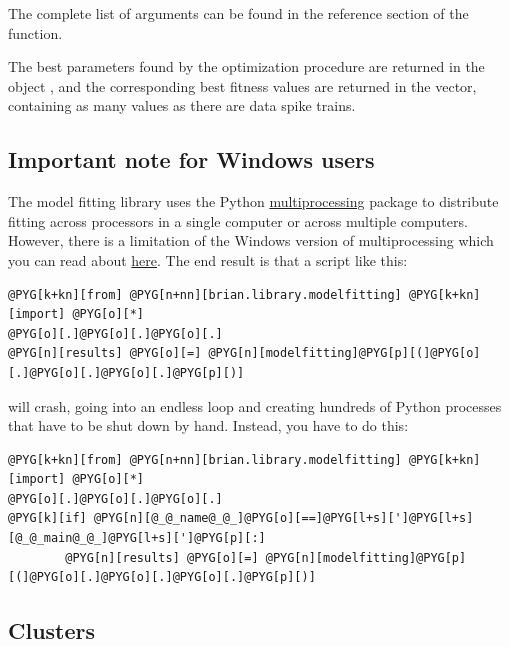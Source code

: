 \documentclass[letterpaper,10pt,english]{manual}
\begin{document}
The complete list of arguments can be found in the reference
section of the \hyperlink{brian.library.modelfitting.modelfitting}{} function.

The best parameters found by the optimization procedure are returned in the \hyperlink{brian.Parameters}{}
object , and the corresponding best fitness values are returned in the
 vector, containing as many values as there are data spike trains.
\hypertarget{note-for-windows-users}{}

\subsection{Important note for Windows users}

The model fitting library uses the Python \href{http://docs.python.org/library/multiprocessing.html}{multiprocessing}
package to distribute fitting across processors in a single computer or across
multiple computers. However, there is a limitation of the Windows version of
multiprocessing which you can read about \href{http://docs.python.org/library/multiprocessing.html\#windows}{here}.
The end result is that a script like this:

\begin{Verbatim}[commandchars=@\[\]]
@PYG[k+kn][from] @PYG[n+nn][brian.library.modelfitting] @PYG[k+kn][import] @PYG[o][*]
@PYG[o][.]@PYG[o][.]@PYG[o][.]
@PYG[n][results] @PYG[o][=] @PYG[n][modelfitting]@PYG[p][(]@PYG[o][.]@PYG[o][.]@PYG[o][.]@PYG[p][)]
\end{Verbatim}

will crash, going into an endless loop and creating hundreds of Python processes
that have to be shut down by hand. Instead, you have to do this:

\begin{Verbatim}[commandchars=@\[\]]
@PYG[k+kn][from] @PYG[n+nn][brian.library.modelfitting] @PYG[k+kn][import] @PYG[o][*]
@PYG[o][.]@PYG[o][.]@PYG[o][.]
@PYG[k][if] @PYG[n][@_@_name@_@_]@PYG[o][==]@PYG[l+s][']@PYG[l+s][@_@_main@_@_]@PYG[l+s][']@PYG[p][:]
        @PYG[n][results] @PYG[o][=] @PYG[n][modelfitting]@PYG[p][(]@PYG[o][.]@PYG[o][.]@PYG[o][.]@PYG[p][)]
\end{Verbatim}
\hypertarget{modelfitting-clusters}{}

\subsection{Clusters}
\end{document}
